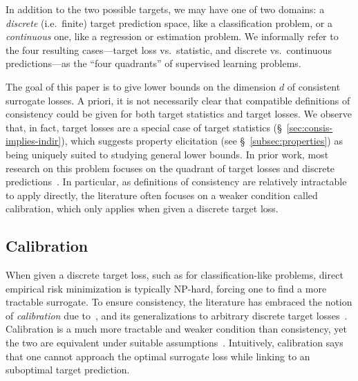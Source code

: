 \documentclass{article}
\newcommand{\Comments}{1}
\newcommand{\mynote}[2]{\ifnum\Comments=1\textcolor{#1}{#2}\fi}
\newcommand{\mytodo}[2]{\ifnum\Comments=1%
	\todo[linecolor=#1!80!black,backgroundcolor=#1,bordercolor=#1!80!black]{#2}\fi}
\newcommand{\raft}[1]{\mytodo{green!20!white}{RF: #1}}
\newcommand{\jessie}[1]{\mynote{purple}{[JF: #1]}}
\begin{document}
In addition to the two possible targets, we may have one of two domains: a \emph{discrete} (i.e.\ finite) target prediction space, like a classification problem, or a \emph{continuous} one, like a regression or estimation problem.
We informally refer to the four resulting cases---target loss vs.\ statistic, and discrete vs.\ continuous predictions---as the ``four quadrants'' of supervised learning problems.

The goal of this paper is to give lower bounds on the dimension $d$ of consistent surrogate losses.
A priori, it is not necessarily clear that compatible definitions of consistency could be given for both target statistics and target losses.
We observe that, in fact, target losses are a special case of target statistics (\S~\ref{sec:consis-implies-indir}),
which suggests property elicitation (see \S~\ref{subsec:properties}) as being uniquely suited to studying general lower bounds.
In prior work, most research on this problem focuses on the quadrant of target losses and discrete predictions~\citep{zhang2004statistical,bartlett2006convexity,tewari2007consistency,ramaswamy2015hierarchical,ramaswamy2016convex,ramaswamy2018consistent}.
In particular, as definitions of consistency are relatively intractable to apply directly, the literature often focuses on a weaker condition called calibration, which only applies when given a discrete target loss.


\subsection{Calibration}\label{subsec:calibration}

When given a discrete target loss, such as for classification-like problems, direct empirical risk minimization is typically NP-hard, forcing one to find a more tractable surrogate.
To ensure consistency, the literature has embraced the notion of \emph{calibration} due to~\citet{tewari2007consistency}, and its generalizations to arbitrary discrete target losses~\citep{agarwal2015consistent,ramaswamy2016convex}.
Calibration is a much more tractable and weaker condition than consistency, yet the two are equivalent under suitable assumptions~\cite{tewari2007consistency,ramaswamy2016convex}.
Intuitively, calibration says that one cannot approach the optimal surrogate loss while linking to an suboptimal target prediction.
\end{document}
